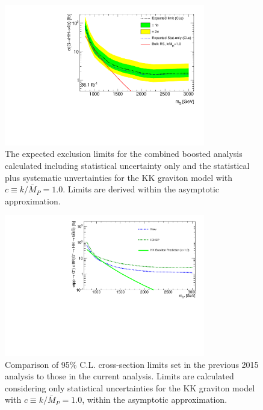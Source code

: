 \begin{figure}
\begin{center}
\includegraphics[width=0.78\textwidth,angle=-90]{figures/boosted/Limit_Stat/limit_combined_RSG10_june29.pdf}
\caption{The expected exclusion limits for the combined boosted analysis calculated including statistical uncertainty only and the statistical plus systematic unvertainties for the KK graviton model with $c \equiv k/\bar{M}_P = 1.0$. Limits are derived within the asymptotic approximation.}
\label{fig:brazil_hh_boosted_all_c10_stat}
\end{center}
\end{figure}

\begin{figure}
\begin{center}
\includegraphics[width=0.78\textwidth,angle=-90]{figures/boosted/Limit_Stat/CompareLimits_HH_Boosted_full2016-ICHEP_c10_ratio.pdf}
\caption{Comparison of 95\% C.L. cross-section limits set in the previous 2015 analysis \cite{ATLAS-CONF-2016-017} to those in the current analysis. Limits are calculated considering only statistical uncertainties for the KK graviton model with $c \equiv k/\bar{M}_P = 1.0$, within the asymptotic approximation.}
\label{fig:Limits_2017_ICHEP_StatOnly}
\end{center}
\end{figure}
\clearpage


